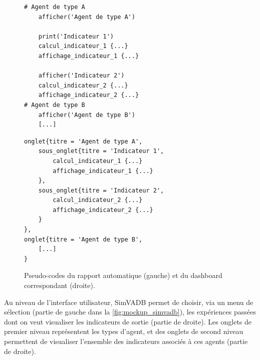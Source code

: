 \begin{figure}[H]
\lstset{frame=shadowbox, tabsize=2, basicstyle=\ttfamily\footnotesize}
\noindent\begin{minipage}[t]{.44\textwidth}
		\begin{lstlisting}[frame=tlrb]
# Agent de type A
	afficher('Agent de type A')
	
	print('Indicateur 1')
	calcul_indicateur_1 {...}
	affichage_indicateur_1 {...}
	
	afficher('Indicateur 2')
	calcul_indicateur_2 {...}
	affichage_indicateur_2 {...}
# Agent de type B
	afficher('Agent de type B')
	[...]
		\end{lstlisting}
\end{minipage} \hspace{.1em}
\begin{minipage}[t]{.53\textwidth}
		\begin{lstlisting}[frame=tlrb]
onglet{titre = 'Agent de type A',
	sous_onglet{titre = 'Indicateur 1',
		calcul_indicateur_1 {...}
		affichage_indicateur_1 {...}
	},
	sous_onglet{titre = 'Indicateur 2',
		calcul_indicateur_2 {...}
		affichage_indicateur_2 {...}
	}
},
onglet{titre = 'Agent de type B',
	[...]
}
		\end{lstlisting}
\end{minipage}
\caption{Pseudo-codes du rapport automatique (gauche) et du dashboard correspondant (droite).}
\label{fig:code-rapport-dashboard}
\end{figure}

Au niveau de l'interface utilisateur, SimVADB permet de choisir, via un menu de sélection (partie de gauche dans la \cref{fig:mockup_simvadb}), les expériences passées dont on veut visualiser les indicateurs de sortie (partie de droite).
Les onglets de premier niveau représentent les types d'agent, et des onglets de second niveau permettent de visualiser l'ensemble des indicateurs associés à ces agents (partie de droite).

